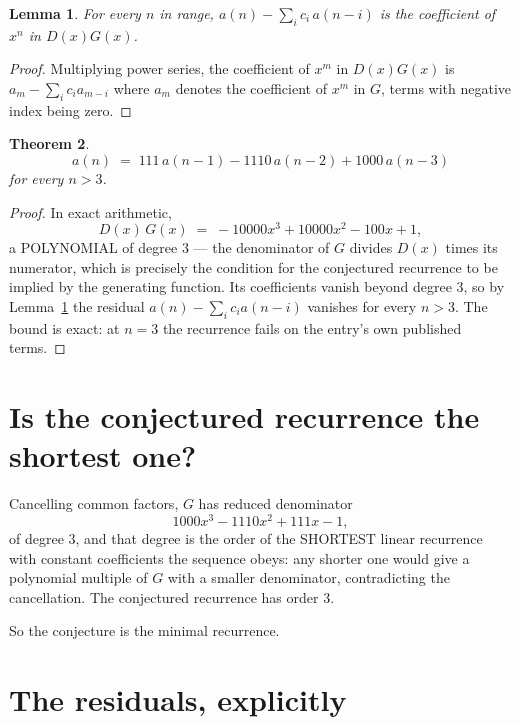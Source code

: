 \documentclass[11pt,a4paper]{article}
\theoremstyle{plain}
\newtheorem{theorem}{Theorem}
\newtheorem{lemma}[theorem]{Lemma}
\theoremstyle{definition}
\begin{document}
\begin{lemma}\label{lem:key}
For every $n$ in range, $a(n)-\sum_i c_i\,a(n-i)$ is the coefficient of $x^{n}$ in
$D(x)G(x)$.
\end{lemma}

\begin{proof}
Multiplying power series, the coefficient of $x^{m}$ in $D(x)G(x)$ is
$a_m-\sum_i c_i a_{m-i}$ where $a_m$ denotes the coefficient of $x^{m}$ in $G$, terms with
negative index being zero.
\end{proof}

\begin{theorem}
\[
a(n)\;=\;111\,a(n-1) - 1110\,a(n-2) + 1000\,a(n-3)
\]
for every $n>3$.
\end{theorem}

\begin{proof}
In exact arithmetic,
\[
D(x)\,G(x)\;=\;- 10000 x^{3} + 10000 x^{2} - 100 x + 1,
\]
a POLYNOMIAL of degree $3$ --- the denominator of $G$ divides $D(x)$ times its numerator,
which is precisely the condition for the conjectured recurrence to be implied by the
generating function. Its coefficients vanish beyond degree $3$, so by
Lemma~\ref{lem:key} the residual $a(n)-\sum_ic_ia(n-i)$ vanishes for every
$n>3$. The bound is exact: at $n=3$ the recurrence fails on the entry's own published terms.
\end{proof}

\section{Is the conjectured recurrence the shortest one?}

Cancelling common factors, $G$ has reduced denominator
\[
1000 x^{3} - 1110 x^{2} + 111 x - 1,
\]
of degree $3$, and that degree is the order of the SHORTEST linear recurrence with
constant coefficients the sequence obeys: any shorter one would give a polynomial multiple of
$G$ with a smaller denominator, contradicting the cancellation. The conjectured recurrence has
order $3$.

So the conjecture is the minimal recurrence.

\section{The residuals, explicitly}
\end{document}
